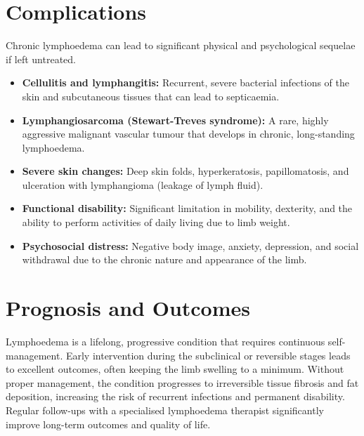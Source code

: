 \section*{Complications}
Chronic lymphoedema can lead to significant physical and psychological sequelae if left untreated.
\begin{itemize}
    \item \textbf{Cellulitis and lymphangitis:} Recurrent, severe bacterial infections of the skin and subcutaneous tissues that can lead to septicaemia.
    \item \textbf{Lymphangiosarcoma (Stewart-Treves syndrome):} A rare, highly aggressive malignant vascular tumour that develops in chronic, long-standing lymphoedema.
    \item \textbf{Severe skin changes:} Deep skin folds, hyperkeratosis, papillomatosis, and ulceration with lymphangioma (leakage of lymph fluid).
    \item \textbf{Functional disability:} Significant limitation in mobility, dexterity, and the ability to perform activities of daily living due to limb weight.
    \item \textbf{Psychosocial distress:} Negative body image, anxiety, depression, and social withdrawal due to the chronic nature and appearance of the limb.
\end{itemize}

\section*{Prognosis and Outcomes}
Lymphoedema is a lifelong, progressive condition that requires continuous self-management. Early intervention during the subclinical or reversible stages leads to excellent outcomes, often keeping the limb swelling to a minimum. Without proper management, the condition progresses to irreversible tissue fibrosis and fat deposition, increasing the risk of recurrent infections and permanent disability. Regular follow-ups with a specialised lymphoedema therapist significantly improve long-term outcomes and quality of life.

